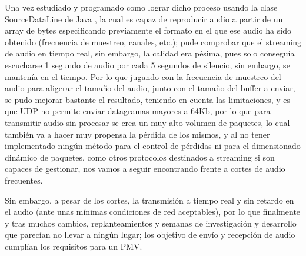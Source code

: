 Una vez estudiado y programado como lograr dicho proceso usando la clase
SourceDataLine de Java \cite{java-SourceDataLine}, la cual es capaz de
reproducir audio a partir de un array de bytes especificando previamente el
formato en el que ese audio ha sido obtenido (frecuencia de muestreo, canales,
etc.); pude comprobar que el streaming de audio en tiempo real, sin embargo, la
calidad era pésima, pues solo conseguía escucharse 1 segundo de audio por cada 5
segundos de silencio, sin embargo, se mantenía en el tiempo. Por lo que jugando
con la frecuencia de muestreo del audio para aligerar el tamaño del audio, junto
con el tamaño del buffer a enviar, se pudo mejorar bastante el resultado,
teniendo en cuenta las limitaciones, y es que UDP no permite enviar datagramas
mayores a 64Kb, por lo que para transmitir audio sin procesar se crea un muy
alto volumen de paquetes, lo cual también va a hacer muy propensa la pérdida de
los mismos, y al no tener implementado ningún método para el control de pérdidas
ni para el dimensionado dinámico de paquetes, como otros protocolos destinados a
streaming si son capaces de gestionar, nos vamos a seguir encontrando frente a
cortes de audio frecuentes. 

Sin embargo, a pesar de los cortes, la transmisión a tiempo real y sin retardo en
el audio (ante unas mínimas condiciones de red aceptables), por lo que
finalmente y tras muchos cambios, replanteamientos y semanas de investigación y
desarrollo que parecían no llevar a ningún lugar; los objetivo de envío y
recepción de audio cumplían los requisitos para un PMV.


